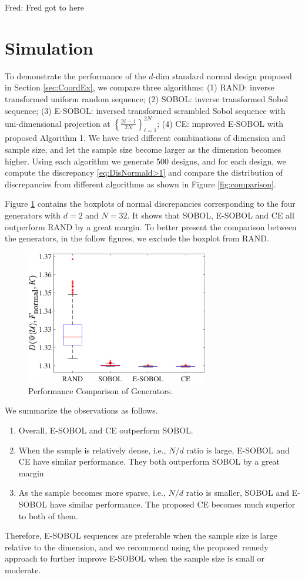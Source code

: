 \documentclass[graybox]{svmult}
\newcommand{\FJH}[1]{{\color{blue}Fred: #1}}
\begin{document}
\FJH{Fred got to here}


\section{Simulation}

To demonstrate the performance of the $d$-dim standard normal design proposed in Section \ref{sec:CoordEx}, we compare three algorithms: (1) RAND: inverse transformed uniform random sequence;  (2) SOBOL: inverse transformed Sobol sequence; (3) E-SOBOL: inversed transformed scrambled Sobol sequence with uni-dimensional projection at $\left\{\frac{2i-1}{2N}\right\}_{i=1}^{2N}$; (4) CE: improved E-SOBOL with proposed Algorithm 1. 
We have tried different combinations of dimension and sample size, and let the sample size become larger as the dimension becomes higher. 
Using each algorithm we generate 500 designs, and for each design, we compute the discrepancy \eqref{eq:DisNormald>1} and compare the distribution of discrepancies from different algorithms as shown in Figure \ref{fig:comparison}. 

Figure \ref{fig:SOBOLVsRAND} contains the boxplots of normal discrepancies corresponding to the four generators with $d=2$ and $N=32$. It shows that SOBOL, E-SOBOL and CE all outperform RAND by a great margin. To better present the comparison between the generators, in the follow figures, we exclude the boxplot from RAND.

\begin{figure}[ht]
\begin{center}
\includegraphics[width=8cm]{code/boxplotall_d2n32.eps}
\caption{Performance Comparison of Generators. \label{fig:SOBOLVsRAND}}
\end{center}
\end{figure}

We summarize the observations as follows. 
\begin{enumerate}
\item
Overall, E-SOBOL and CE outperform SOBOL. 
\item 
When the sample is relatively dense, i.e., $N/d$ ratio is large, E-SOBOL and CE have similar performance. They both outperform SOBOL by a great margin
\item
As the sample becomes more sparse, i.e., $N/d$ ratio is smaller, SOBOL and E-SOBOL have similar performance. The proposed CE becomes much superior to both of them.
\end{enumerate}
Therefore, E-SOBOL sequences are preferable when the sample size is large relative to the dimension, and we recommend using the proposed remedy approach to further improve E-SOBOL when the sample size is small or moderate. 
\end{document}
